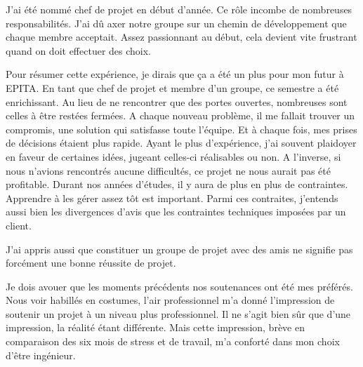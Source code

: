 \documentclass[12pt]{article}
\begin{document}
J'ai été nommé chef de projet en début d'année. Ce rôle incombe de nombreuses responsabilités. J'ai dû axer notre groupe sur un chemin de développement que chaque membre acceptait. Assez passionnant au début, cela devient vite frustrant quand on doit effectuer des choix. 

Pour résumer cette expérience, je dirais que ça a été un plus pour mon futur à EPITA. En tant que chef de projet et membre d'un groupe, ce semestre a été enrichissant. Au lieu de ne rencontrer que des portes ouvertes, nombreuses sont celles à être restées fermées. A chaque nouveau problème, il me fallait trouver un compromis, une solution qui satisfasse toute l'équipe. Et à chaque fois, mes prises de décisions étaient plus rapide. Ayant le plus d'expérience, j'ai souvent plaidoyer en faveur de certaines idées, jugeant celles-ci réalisables ou non. A l'inverse, si nous n'avions rencontrés aucune difficultés, ce projet ne nous aurait pas été profitable. Durant nos années d'études, il y aura de plus en plus de contraintes. Apprendre à les gérer assez tôt est important. Parmi ces contraites, j'entends aussi bien les divergences d'avis que les contraintes techniques imposées par un client. 

J'ai appris aussi que constituer un groupe de projet avec des amis ne signifie pas forcément une bonne réussite de projet. 

Je dois avouer que les moments précédents nos soutenances ont été mes préférés. Nous voir habillés en costumes, l'air professionnel m'a donné l'impression de soutenir un projet à un niveau plus professionnel. Il ne s'agit bien sûr que d'une impression, la réalité étant différente. Mais cette impression, brève en comparaison des six mois de stress et de travail, m'a conforté dans mon choix d'être ingénieur.

\newpage
\listoffigures
\end{document}

